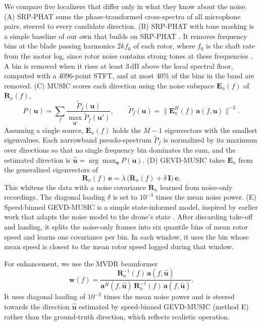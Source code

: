 \documentclass{svproc}
\begin{document}
We compare five localizers that differ only in what they know about the noise.
(A) SRP-PHAT \cite{dibiase2000srp} sums the phase-transformed cross-spectra of all microphone pairs, steered to every candidate direction.
(B) SRP-PHAT with tone masking is a simple baseline of our own that builds on SRP-PHAT \cite{dibiase2000srp}.
It removes frequency bins at the blade passing harmonics $2kf_0$ of each rotor, where $f_0$ is the shaft rate from the motor log, since rotor noise contains strong tones at these frequencies \cite{yen2023ncm}.
A bin is removed when it rises at least 3\,dB above the local spectral floor, computed with a 4096-point STFT, and at most 40\% of the bins in the band are removed.
(C) MUSIC \cite{schmidt1986music} scores each direction using the noise subspace $\mathbf{E}_n(f)$ of $\mathbf{R}_x(f)$,
\begin{equation}\label{eq:music}
P(\mathbf{u})=\sum_{f}\frac{\tilde P_f(\mathbf{u})}{\max_{\mathbf{u}'}\tilde P_f(\mathbf{u}')},\qquad
\tilde P_f(\mathbf{u})=\big\|\mathbf{E}_n^{H}(f)\,\mathbf{a}(f,\mathbf{u})\big\|^{-2}.
\end{equation}
Assuming a single source, $\mathbf{E}_n(f)$ holds the $M-1$ eigenvectors with the smallest eigenvalues.
Each narrowband pseudo-spectrum $\tilde P_f$ is normalized by its maximum over directions so that no single frequency bin dominates the sum, and the estimated direction is $\hat{\mathbf{u}}=\arg\max_{\mathbf{u}}P(\mathbf{u})$.
(D) GEVD-MUSIC \cite{nakamura2011gevd} takes $\mathbf{E}_n$ from the generalized eigenvectors of
\begin{equation}\label{eq:gevd}
\mathbf{R}_x(f)\,\mathbf{e}=\lambda\,\big(\mathbf{R}_n(f)+\delta\,\mathbf{I}\big)\,\mathbf{e}.
\end{equation}
This whitens the data with a noise covariance $\mathbf{R}_n$ learned from noise-only recordings.
The diagonal loading $\delta$ is set to $10^{-3}$ times the mean noise power.
(E) Speed-binned GEVD-MUSIC is a simple state-informed model, inspired by earlier work that adapts the noise model to the drone's state \cite{furukawa2013ncm,yen2023ncm}.
After discarding take-off and landing, it splits the noise-only frames into six quantile bins of mean rotor speed and learns one covariance per bin.
In each window, it uses the bin whose mean speed is closest to the mean rotor speed logged during that window.

For enhancement, we use the MVDR beamformer \cite{capon1969mvdr}
\begin{equation}\label{eq:mvdr}
\mathbf{w}(f)=\frac{\mathbf{R}_n^{-1}(f)\,\mathbf{a}(f,\hat{\mathbf{u}})}{\mathbf{a}^{H}(f,\hat{\mathbf{u}})\,\mathbf{R}_n^{-1}(f)\,\mathbf{a}(f,\hat{\mathbf{u}})}.
\end{equation}
It uses diagonal loading of $10^{-2}$ times the mean noise power and is steered towards the direction $\hat{\mathbf{u}}$ estimated by speed-binned GEVD-MUSIC (method E) rather than the ground-truth direction, which reflects realistic operation.
\end{document}
